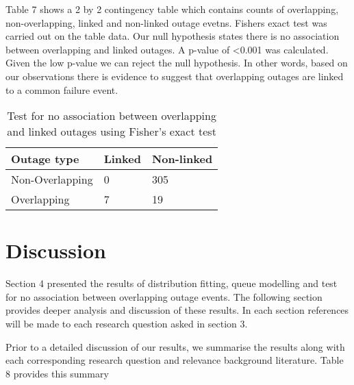 \documentclass[5p]{elsarticle}
\begin{document}
Table 7 shows a 2 by 2 contingency table which contains counts of overlapping, non-overlapping, linked and non-linked outage evetns. Fishers exact test was carried out on the table data. Our null hypothesis states there is no association between overlapping and linked outages. A p-value of \textless 0.001 was calculated. Given the low p-value we can reject the null hypothesis. In other words, based on our observations there is evidence to suggest that overlapping outages are linked to a common failure event.

\begin {table}
\caption {Test for no association between overlapping and linked outages using Fisher's exact test} 
\begin{center}
\begin{tabular}{p{2.7cm} |  p{1.1cm} | p{2cm}} \hline \bf{Outage type} & \bf{Linked}  & \bf{Non-linked}
\\ \hline Non-Overlapping  & 0 & 305
\\ Overlapping & 7 & 19
\\ \hline
\end{tabular}
\end{center}
\end{table}

\section{Discussion}

Section 4 presented the results of distribution fitting, queue modelling and test for no association between overlapping outage events. The following section provides deeper analysis and discussion of these results. In each section references will be made to each research question asked in section 3. 

Prior to a detailed discussion of our results, we summarise the results along with each corresponding research question and relevance background literature. Table 8 provides this summary
\end{document}
